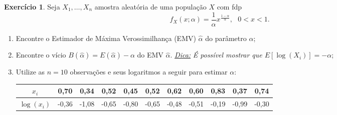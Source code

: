 \documentclass[]{article}
\theoremstyle{definition}
\newtheorem{ex}{Exercício}
\begin{document}
\begin{ex}
Seja $X_1, \ldots, X_n$ amostra aleatória de uma população $X$ com fdp
$$
f_X(x;\alpha) = \frac{1}{\alpha}x^{\frac{1-\alpha}{\alpha}}, \ \ \ 0<x<1.
$$
\begin{enumerate}
	\item Encontre o Estimador de Máxima Verossimilhança (EMV) $\hat\alpha$ do parâmetro $\alpha$;%
	\item Encontre o vício $B(\hat\alpha) = E(\hat\alpha) - \alpha$ do EMV $\hat\alpha$. \underline{\textit{Dica:}} \textit{É possível mostrar que $E[\log(X_i)] = -\alpha$};%
	\item Utilize as $n=10$ observações e seus logaritmos a seguir para estimar $\alpha$:
	\begin{center}
		\begin{tabular}{c|cccccccccc}
			\hline
			$x_i$& 0,70& 0,34& 0,52& 0,45& 0,52& 0,62& 0,60& 0,83& 0,37& 0,74\\
			\hline
			$\log(x_i)$& -0,36& -1,08& -0,65& -0,80& -0,65& -0,48& -0,51& -0,19& -0,99& -0,30\\
			\hline
		\end{tabular}
	\end{center}
\end{enumerate}
\end{ex}
\end{document}
